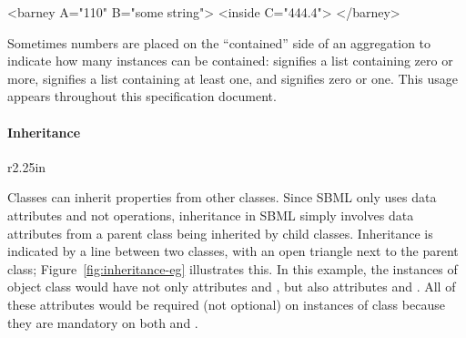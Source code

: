 \begin{blockChanged}
\begin{example}
<barney A="110" B="some string">
    <inside C="444.4">
</barney>
\end{example}

Sometimes numbers are placed on the ``contained'' side of an
aggregation to indicate how many instances can be contained:
\token{[0..*]} signifies a list containing zero or more,
\token{[1..*]} signifies a list containing at least one, and
\token{[0..1]} signifies zero or one.  This usage appears
throughout this specification document.


\paragraph{Inheritance}

\begin{wrapfigure}[18]{r}{2.25in}
  \centering
  \small
  \vspace*{-4ex}
  \caption{Inheritance.}
  \label{fig:inheritance-eg}
\end{wrapfigure}
Classes can inherit properties from other classes.  Since SBML
only uses data attributes and not operations, inheritance in SBML
simply involves data attributes from a parent class being
inherited by child classes.  Inheritance is indicated by a line
between two classes, with an open triangle next to the parent
class; Figure~\ref{fig:inheritance-eg} illustrates this.  In this
example, the instances of object class  would have
not only attributes  and , but also attributes
 and .  All of these attributes would be
required (not optional) on instances of class 
because they are mandatory on both  and
.




\end{blockChanged}
